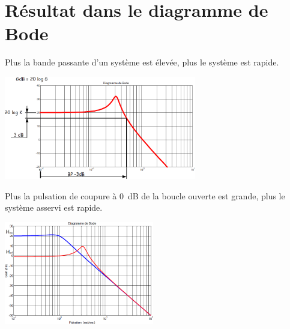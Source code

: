 \documentclass[10pt,fleqn]{article} %
\begin{document}
\section{Résultat dans le diagramme de Bode}


\noindent\begin{minipage}[c]{.48\linewidth}
\begin{resultat}
Plus la bande passante d'un système est élevée, plus le système est rapide.
\end{resultat}

\begin{center}
\includegraphics[height=4.5cm]{images/bandepassante}
\end{center}

\end{minipage} \hfill
\begin{minipage}[c]{.48\linewidth}
\begin{resultat}
Plus la pulsation de coupure à \SI{0}{dB} de la boucle ouverte est grande, plus le système asservi est rapide.
\end{resultat}


\begin{center}
\includegraphics[height=4.5cm]{images/bobf}
\end{center}
\end{minipage}


%
%
%
%
%
\end{document}
